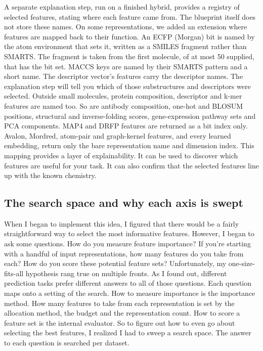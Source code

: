 A separate explanation step, run on a finished hybrid, provides a registry of selected features, stating where each feature came from. The blueprint itself does not store these names. On some representations, we added an extension where features are mapped back to their function. An ECFP (Morgan) bit is named by the atom environment that sets it, written as a SMILES fragment rather than SMARTS. The fragment is taken from the first molecule, of at most 50 supplied, that has the bit set. MACCS keys are named by their SMARTS pattern and a short name. The descriptor vector's features carry the descriptor names. The explanation step will tell you which of those substructures and descriptors were selected. Outside small molecules, protein composition, descriptor and k-mer features are named too. So are antibody composition, one-hot and BLOSUM positions, structural and inverse-folding scores, gene-expression pathway sets and PCA components. MAP4 and DRFP features are returned as a bit index only. Avalon, Mordred, atom-pair and graph-kernel features, and every learned embedding, return only the bare representation name and dimension index. This mapping provides a layer of explainability. It can be used to discover which features are useful for your task. It can also confirm that the selected features line up with the known chemistry.

\subsection{The search space and why each axis is swept}

When I began to implement this idea, I figured that there would be a fairly straightforward way to select the most informative features. However, I began to ask some questions. How do you measure feature importance? If you're starting with a handful of input representations, how many features do you take from each? How do you score these potential feature sets? Unfortunately, my one-size-fits-all hypothesis rang true on multiple fronts. As I found out, different prediction tasks prefer different answers to all of those questions. Each question maps onto a setting of the search. How to measure importance is the importance method. How many features to take from each representation is set by the allocation method, the budget and the representation count. How to score a feature set is the internal evaluator. So to figure out how to even go about selecting the best features, I realized I had to sweep a search space. The answer to each question is searched per dataset.

